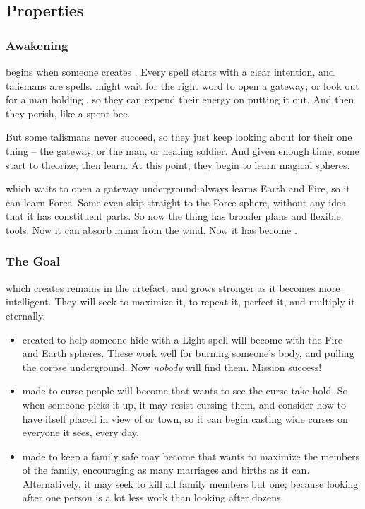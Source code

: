 \begin{multicols}{2}

\subsection{Properties}

\subsubsection{Awakening}
begins when someone creates .
Every spell starts with a clear intention, and \glspl{talisman} are spells.
 might wait for the right word to open a gateway; or look out for a man holding , so they can expend their energy on putting it out.
And then they perish, like a spent bee.

But some \glspl{talisman} never succeed, so they just keep looking about for their one thing -- the gateway, or the man, or healing  soldier.
And given enough time, some start to theorize, then learn.
At this point, they begin to learn magical \glspl{sphere}.

 which waits to open a gateway underground always learns Earth and Fire, so it can learn Force.
Some even skip straight to the Force \gls{sphere}, without any idea that it has constituent parts.
So now the thing has broader plans and flexible tools.
Now it can absorb mana from the wind.
Now it has become .

\subsubsection{The Goal}
which creates  remains in the \gls{artefact}, and grows stronger as it becomes more intelligent.
They will seek to maximize it, to repeat it, perfect it, and multiply it eternally.

\begin{itemize}
  \item
   created to help someone hide with a Light spell will become  with the Fire and Earth \glspl{sphere}.
  These work well for burning someone's body, and pulling the corpse underground.
  Now \textit{nobody} will find them.
  Mission success!
  \item
   made to curse people will become  that wants to see the curse take hold.
  So when someone picks it up, it may resist cursing them, and consider how to have itself placed in view of  or town, so it can begin casting wide curses on everyone it sees, every day.
  \item
   made to keep a family safe may become  that wants to maximize the members of the family, encouraging as many marriages and births as it can.
  Alternatively, it may seek to kill all family members but one; because looking after one person is a lot less work than looking after dozens.
\end{itemize}


\end{multicols}
